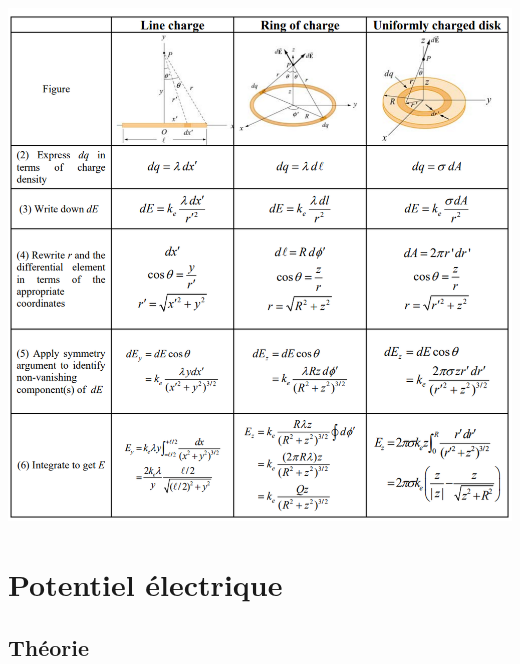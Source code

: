 \documentclass[a4paper]{article}
\begin{document}
\begin{center}
\includegraphics[width=\textwidth]{ExemplesFluxElec.PNG}
\end{center}






















\section{Potentiel électrique}











\subsection{Théorie}
\end{document}
